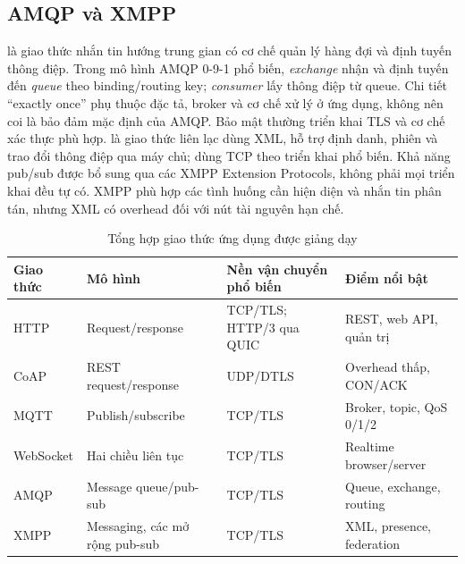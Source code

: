 \subsection{AMQP và XMPP}
 là giao thức nhắn tin hướng trung gian có cơ chế quản lý hàng đợi và định tuyến thông điệp. Trong mô hình AMQP 0-9-1 phổ biến, \emph{exchange} nhận và định tuyến đến \emph{queue} theo binding/routing key; \emph{consumer} lấy thông điệp từ queue. Chi tiết ``exactly once'' phụ thuộc đặc tả, broker và cơ chế xử lý ở ứng dụng, không nên coi là bảo đảm mặc định của AMQP. Bảo mật thường triển khai TLS và cơ chế xác thực phù hợp.
 là giao thức liên lạc dùng XML, hỗ trợ định danh, phiên và trao đổi thông điệp qua máy chủ; dùng TCP theo triển khai phổ biến. Khả năng pub/sub được bổ sung qua các XMPP Extension Protocols, không phải mọi triển khai đều tự có. XMPP phù hợp các tình huống cần hiện diện và nhắn tin phân tán, nhưng XML có overhead đối với nút tài nguyên hạn chế.
\begin{table}[htbp]\centering\scriptsize\caption{Tổng hợp giao thức ứng dụng được giảng dạy}
\begin{tabularx}{\textwidth}{@{}p{19mm}p{26mm}p{22mm}X@{}}\toprule
Giao thức & Mô hình & Nền vận chuyển phổ biến & Điểm nổi bật\\\midrule
HTTP & Request/response & TCP/TLS; HTTP/3 qua QUIC & REST, web API, quản trị\\
CoAP & REST request/response & UDP/DTLS & Overhead thấp, CON/ACK\\
MQTT & Publish/subscribe & TCP/TLS & Broker, topic, QoS 0/1/2\\
WebSocket & Hai chiều liên tục & TCP/TLS & Realtime browser/server\\
AMQP & Message queue/pub-sub & TCP/TLS & Queue, exchange, routing\\
XMPP & Messaging, các mở rộng pub-sub & TCP/TLS & XML, presence, federation\\\bottomrule
\end{tabularx}
\end{table}